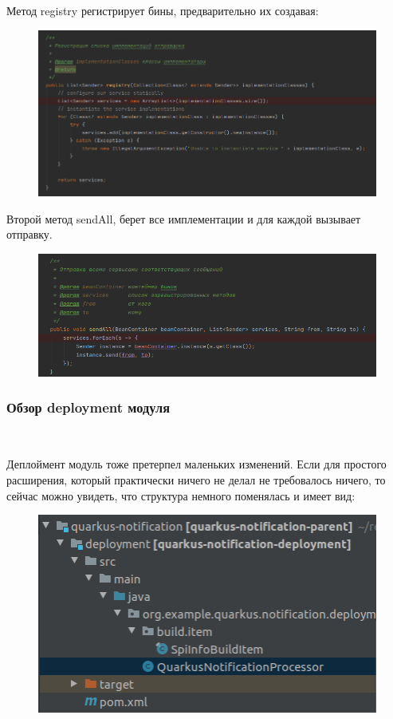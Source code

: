 \documentclass[russian,11pt]{article}
\begin{document}
Метод registry регистрирует бины, предварительно их создавая:

\begin{figure}[H]
	\centering
	\includegraphics[width=\textwidth]{15}
\end{figure}
Второй метод sendAll, берет все имплементации и для каждой вызывает отправку.

\begin{figure}[H]
	\centering
	\includegraphics[width=\textwidth]{16}
\end{figure}

\newpage 
\subsubsection{Обзор deployment модуля}
~

Деплоймент модуль тоже претерпел маленьких изменений. Если для простого расширения, который практически ничего не делал не требовалось ничего, то сейчас можно увидеть, что структура немного поменялась и имеет вид:

\begin{figure}[H]
	\centering
	\includegraphics[width=\textwidth]{17}
\end{figure}
\end{document}

